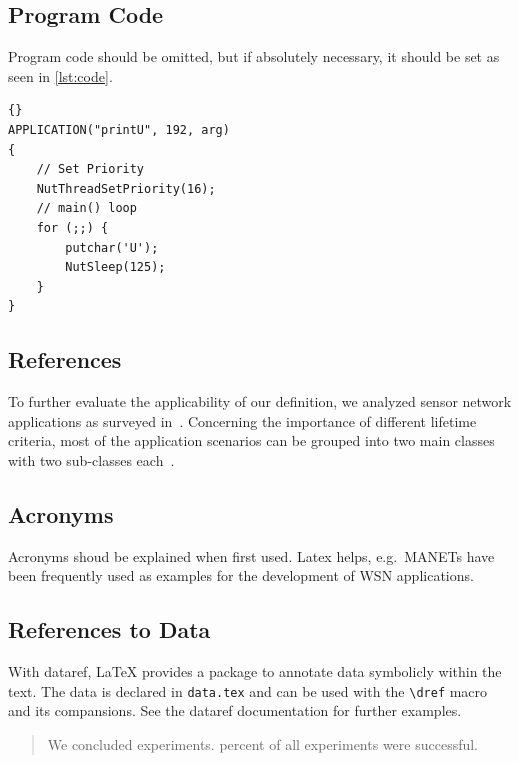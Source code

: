 \subsection{Program Code}

Program code should be omitted, but if absolutely necessary, it should be set as seen in \cref{lst:code}.

\begin{lstlisting}[style=txt,caption=Sample application,label=lst:code]{}
APPLICATION("printU", 192, arg)
{
    // Set Priority
    NutThreadSetPriority(16);
    // main() loop
    for (;;) {
        putchar('U');
        NutSleep(125);
    }
}
\end{lstlisting}


\subsection{References}

To further evaluate the applicability of our definition, we analyzed sensor network applications as surveyed in~\cite{akyildiz2002survey,arampatzis2005survey,khemapach2005survey}. Concerning the importance of different lifetime criteria, most of the application scenarios can be grouped into two main classes with two sub-classes each~\cite{dietrich2009lifetime}.


\subsection{Acronyms}

Acronyms shoud be explained when first used. Latex helps, e.g.\ \acp{MANET} have been frequently used as examples for the development of \ac{WSN} applications.

\subsection{References to Data}

With dataref, \LaTeX{}
provides a package to annotate data symbolicly within the text. The
data is declared in \verb|data.tex| and can be used with the
\verb|\dref| macro and its compansions. See the dataref documentation
for further examples.

\begin{quote}
  We concluded 
  experiments.  percent of all experiments
  were successful.
\end{quote}

